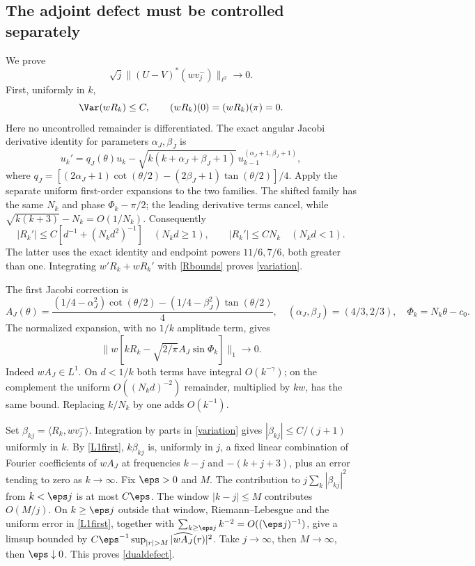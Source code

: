 \subsection{The adjoint defect must be controlled separately}
We prove
\begin{equation}\label{dualdefect}
 \sqrt j\|(U-V)^*(wv_j^-)\|_{\ell^2}\to0.
\end{equation}
First, uniformly in $k$,
\begin{equation}\label{variation}
 \Var(wR_k)\le C,\qquad (wR_k)(0)=(wR_k)(\pi)=0.
\end{equation}
Here no uncontrolled remainder is differentiated. The exact angular
Jacobi derivative identity for parameters $\alpha_J,\beta_J$ is
\[
 u_k'=q_J(\theta)u_k-
       \sqrt{k(k+\alpha_J+\beta_J+1)}\,
                      u_{k-1}^{(\alpha_J+1,\beta_J+1)},
\]
where $q_J=[(2\alpha_J+1)\cot(\theta/2)
-(2\beta_J+1)\tan(\theta/2)]/4$.
Apply the separate uniform first-order expansions to the two families.
The shifted family has the same $N_k$ and phase $\Phi_k-\pi/2$;
the leading derivative terms cancel, while
$\sqrt{k(k+3)}-N_k=O(1/N_k)$. Consequently
\[
 |R_k'|\le C[d^{-1}+(N_kd^2)^{-1}]\quad(N_kd\ge1),\qquad
 |R_k'|\le CN_k\quad(N_kd<1).
\]
The latter uses the exact identity and endpoint powers $11/6,7/6$,
both greater than one. Integrating $w'R_k+wR_k'$ with
\eqref{Rbounds} proves \eqref{variation}.

The first Jacobi correction is
\[
 A_J(\theta)=\frac{(1/4-\alpha_J^2)\cot(\theta/2)
                  -(1/4-\beta_J^2)\tan(\theta/2)}4,
 \quad (\alpha_J,\beta_J)=(4/3,2/3),\quad\Phi_k=N_k\theta-c_0.
\]
The normalized expansion, with no $1/k$ amplitude term, gives
\begin{equation}\label{L1first}
 \|w[kR_k-\sqrt{2/\pi}A_J\sin\Phi_k]\|_1\longrightarrow0.
\end{equation}
Indeed $wA_J\in L^1$. On $d<1/k$ both terms have integral
$O(k^{-\gamma})$; on the complement the uniform
$O((N_kd)^{-2})$ remainder, multiplied by $kw$, has the same bound.
Replacing $k/N_k$ by one adds $O(k^{-1})$.

Set $\beta_{kj}=\langle R_k,wv_j^-\rangle$. Integration by parts
in \eqref{variation} gives $|\beta_{kj}|\le C/(j+1)$ uniformly
in $k$. By \eqref{L1first}, $k\beta_{kj}$ is, uniformly in $j$,
a fixed linear combination of Fourier coefficients of $wA_J$ at
frequencies $k-j$ and $-(k+j+3)$, plus an error tending to zero
as $k\to\infty$. Fix $\eps>0$ and $M$. The contribution to
$j\sum_k|\beta_{kj}|^2$ from $k<\eps j$ is at most $C\eps$.
The window $|k-j|\le M$ contributes $O(M/j)$.
On $k\ge\eps j$ outside that window, Riemann--Lebesgue and the
uniform error in \eqref{L1first}, together with
$\sum_{k\ge\eps j}k^{-2}=O((\eps j)^{-1})$, give a limsup
bounded by $C\eps^{-1}\sup_{|r|>M}|\widehat{wA_J}(r)|^2$.
Take $j\to\infty$, then $M\to\infty$, then $\eps\downarrow0$.
This proves \eqref{dualdefect}.

